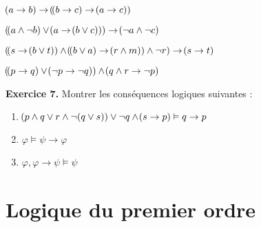 \documentclass[a4paper,french,bookmarks]{book}
\begin{document}
\begin{enumerate}
\begin{minipage}{0.48\linewidth}
        \item $\!\left(a \rightarrow b\right) \rightarrow \!\left(\!\left(b \rightarrow c\right) \rightarrow \!\left(a \rightarrow c\right)\right)$
             
        \item $\!\left(\!\left(a \land \neg b\right) \lor \!\left(a \rightarrow \!\left(b \lor c\right)\right)\right) \rightarrow \!\left(\neg a \land \neg c\right)$
             
        \item $\!\left(\!\left(s \rightarrow \!\left(b \lor t\right)\right) \land \!\left(\!\left(b \lor a\right) \rightarrow \!\left(r \land m\right)\right) \land \neg r\right) \rightarrow \!\left(s \rightarrow t\right)$
             
        \item $\!\left(\!\left(p \rightarrow q\right) \lor \!\left(\neg p \rightarrow \neg q\right)\right) \land \!\left(q \land r \rightarrow \neg p\right)$
    \end{minipage}
    \end{enumerate}
    
     \textbf{Exercice 7.} Montrer les conséquences logiques suivantes :
     
     \begin{enumerate}
         \item $\!\left(p \land q \lor r \land \neg\!\left(q \lor s\right)\right) \lor \neg q \land \!\left(s \rightarrow p\right) \vDash q \rightarrow p$
         
         \item $\varphi \vDash \psi \rightarrow \varphi$
         
         
         \noafter
         \nobefore\yesafter
         
         \item $\varphi, \varphi \rightarrow \psi \vDash \psi$
    \end{enumerate}
    
    \section{Logique du premier ordre}
    
\end{document}

